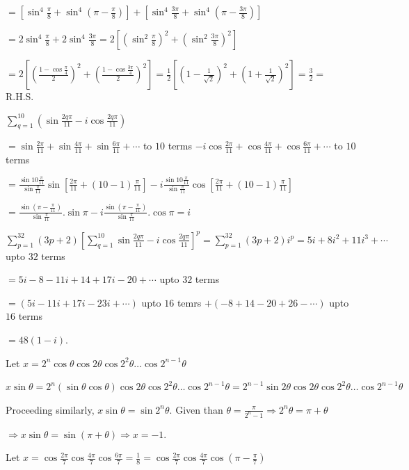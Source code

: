   $= \left[\sin^4\frac{\pi}{8} + \sin^4\left(\pi - \frac{\pi}{8}\right)\right] + \left[\sin^4\frac{3\pi}{8}
  + \sin^4\left(\pi - \frac{3\pi}{8}\right)\right]$

  $= 2\sin^4\frac{\pi}{8} + 2\sin^4\frac{3\pi}{8} = 2\left[\left(\sin^2\frac{\pi}{8}\right)^2
  + \left(\sin^2\frac{3\pi}{8}\right)^2\right]$

  $= 2\left[\left(\frac{1 - \cos\frac{\pi}{4}}{2}\right)^2 + \left(\frac{1
    - \cos\frac{3\pi}{4}}{2}\right)^2\right] = \frac{1}{2}\left[\left(1 - \frac{1}{\sqrt{2}}\right)^2
  + \left(1 + \frac{1}{\sqrt{2}}\right)^2\right] = \frac{3}{2} =$ R.H.S.
\item $\displaystyle\sum_{q = 1}^{10}\left(\sin\frac{2q\pi}{11} - i\cos\frac{2q\pi}{11}\right)$

  $= \sin\frac{2\pi}{11} + \sin\frac{4\pi}{11} + \sin\frac{6\pi}{11} + \cdots$ to $10$ terms
  $- i\cos\frac{2\pi}{11} + \cos\frac{4\pi}{11} + \cos\frac{6\pi}{11} + \cdots$ to $10$ terms

  $= \frac{\sin10\frac{\pi}{11}}{\sin\frac{\pi}{11}}\sin\left[\frac{2\pi}{11} + (10 -
  1)\frac{\pi}{11}\right] - i\frac{\sin10\frac{\pi}{11}}{\sin\frac{\pi}{11}}\cos\left[\frac{2\pi}{11} + (10
  - 1)\frac{\pi}{11}\right]$

  $= \frac{\sin\left(\pi - \frac{\pi}{11}\right)}{\sin\frac{\pi}{11}}.\sin\pi - i\frac{\sin\left(\pi
  - \frac{\pi}{11}\right)}{\sin\frac{\pi}{11}}.\cos\pi = i$

  $\displaystyle\sum_{p = 1}^{32}(3p + 2)\left[\displaystyle\sum_{q = 1}^{10}\sin\frac{2q\pi}{11} -
  i\cos\frac{2q\pi}{11}\right]^p = \sum_{p=1}^{32}(3p + 2)i^p = 5i + 8i^2 + 11i^3 + \cdots$ upto $32$ terms

  $= 5i - 8 - 11i + 14 + 17i - 20 + \cdots$ upto $32$ terms

  $= (5i - 11i + 17i - 23i + \cdots)$ upto $16$ temrs $+ (-8 + 14 - 20 + 26 - \cdots)$ upto $16$ terms

  $= 48(1 - i)$.
\item Let $x = 2^n\cos\theta\cos2\theta\cos2^2\theta\ldots\cos2^{n - 1}\theta$

  $x\sin\theta = 2^n(\sin\theta\cos\theta)\cos2\theta\cos2^2\theta\ldots\cos2^{n - 1}\theta = 2^{n -
  1}\sin2\theta\cos2\theta\cos2^2\theta\ldots\cos2^{n - 1}\theta$

  Proceeding similarly, $x\sin\theta = \sin2^n\theta$. Given than $\theta = \frac{\pi}{2^n - 1} \Rightarrow
  2^n\theta = \pi + \theta$

  $\Rightarrow x\sin\theta = \sin(\pi + \theta) \Rightarrow x = -1$.
\item Let $x = \cos\frac{2\pi}{7}\cos\frac{4\pi}{7}\cos\frac{6\pi}{7} = \frac{1}{8}
  = \cos\frac{2\pi}{7}\cos\frac{4\pi}{7}\cos\left(\pi - \frac{\pi}{7}\right)$

